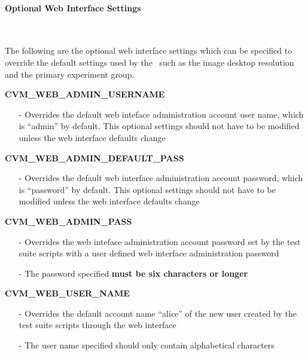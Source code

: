 \paragraph*{Optional Web Interface Settings}~\newline

The following are the optional web interface settings which can be specified to override
the default settings used by the \cernvmtestframework\, such as the \cernvm image desktop
resolution and the primary experiment group.

\begin{description}
\item {\bf CVM\_WEB\_ADMIN\_USERNAME}
		\begin{itemize}
		\item[-]	Overrides the default web inteface administration account user name,
				which is ``admin'' by default. This optional settings should not 
				have to be modified unless the \cernvm web interface defaults change
		\end{itemize}
		
\item {\bf CVM\_WEB\_ADMIN\_DEFAULT\_PASS}
		\begin{itemize}
		\item[-]	Overrides the default web interface administration account password,
				which is ``password'' by default. This optional settings should not 
				have to be modified unless the \cernvm web interface defaults change
		\end{itemize}
		
\item {\bf CVM\_WEB\_ADMIN\_PASS}
		\begin{itemize}
		\item[-]	Overrides the web inteface administration account password set by
				the test suite scripts with a user defined web interface
				administration password
		\item[-]	The password specified {\bf must be six characters or longer}
		\end{itemize}

\item {\bf CVM\_WEB\_USER\_NAME}
		\begin{itemize}
		\item[-]	Overrides the default account name ``alice'' of the new user created 
				by the test suite scripts through the web interface
		\item[-]	The user name specified should only contain alphabetical characters
		\end{itemize}
		

\end{description}
